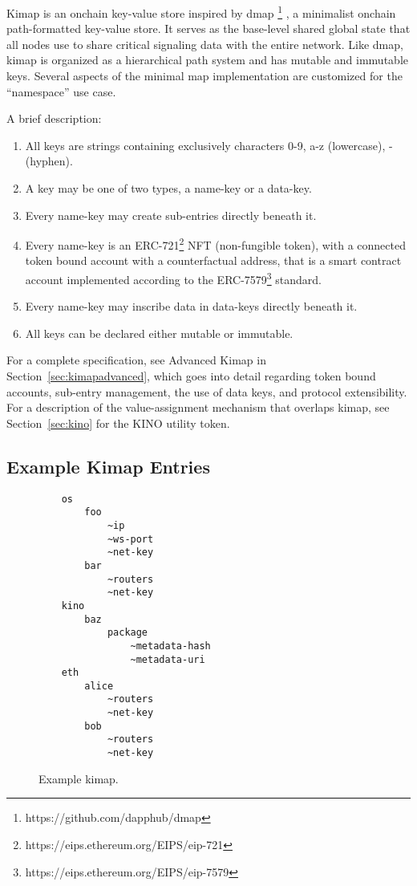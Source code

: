 \documentclass[runningheads]{llncs}
\begin{document}
Kimap is an onchain key-value store inspired by dmap
\footnote{https://github.com/dapphub/dmap}
, a minimalist onchain path-formatted key-value store.
It serves as the base-level shared global state that all nodes use to share critical signaling data with the entire network.
Like dmap, kimap is organized as a hierarchical path system and has mutable and immutable keys.
Several aspects of the minimal map implementation are customized for the ``namespace'' use case.

A brief description:

\begin{enumerate}
    \item All keys are strings containing exclusively characters 0-9, a-z (lowercase), - (hyphen).
    \item A key may be one of two types, a name-key or a data-key.
    \item Every name-key may create sub-entries directly beneath it.
    \item Every name-key is an ERC-721\footnote{https://eips.ethereum.org/EIPS/eip-721} NFT (non-fungible token),
    with a connected token bound account with a counterfactual address,
    that is a smart contract account implemented according to the ERC-7579\footnote{https://eips.ethereum.org/EIPS/eip-7579} standard.
    \item Every name-key may inscribe data in data-keys directly beneath it.
    \item All keys can be declared either mutable or immutable.
\end{enumerate}

For a complete specification, see Advanced Kimap in Section~\ref{sec:kimapadvanced}, which goes into detail regarding token bound accounts, sub-entry management, the use of data keys, and protocol extensibility.
For a description of the value-assignment mechanism that overlaps kimap, see Section~\ref{sec:kino} for the KINO utility token.

\subsection{Example Kimap Entries}

\begin{figure}[H]
    \centering
    \begin{verbatim}
    os
        foo
            ~ip
            ~ws-port
            ~net-key
        bar
            ~routers
            ~net-key
    kino
        baz
            package
                ~metadata-hash
                ~metadata-uri
    eth
        alice
            ~routers
            ~net-key
        bob
            ~routers
            ~net-key
    \end{verbatim}
    \caption{Example kimap.}
    \label{fig:example kimap}
\end{figure}
\end{document}
